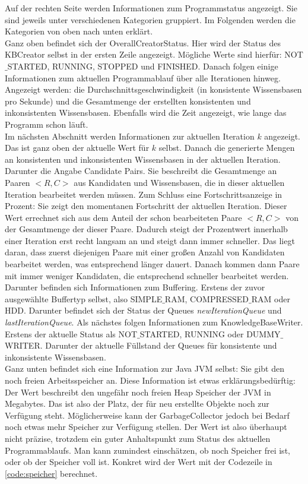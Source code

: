 \documentclass[12pt,a4paper]{article}
\begin{document}
Auf der rechten Seite werden Informationen zum Programmstatus angezeigt. Sie sind jeweils unter verschiedenen Kategorien gruppiert. Im Folgenden werden die Kategorien von oben nach unten erklärt. \\
Ganz oben befindet sich der OverallCreatorStatus. Hier wird der Status des KBCreator selbst in der ersten Zeile angezeigt. Mögliche Werte sind hierfür: NOT$\_$STARTED, RUNNING, STOPPED und FINISHED. Danach folgen einige Informationen zum aktuellen Programmablauf über alle Iterationen hinweg. Angezeigt werden: die Durchschnittsgeschwindigkeit (in konsistente Wissensbasen pro Sekunde) und die Gesamtmenge der erstellten konsistenten und inkonsistenten Wissensbasen. Ebenfalls wird die Zeit angezeigt, wie lange das Programm schon läuft. \\
Im nächsten Abschnitt werden Informationen zur aktuellen Iteration $k$ angezeigt. Das ist ganz oben der aktuelle Wert für $k$ selbst. Danach die generierte Mengen an konsistenten und inkonsistenten Wissensbasen in der aktuellen Iteration. Darunter die Angabe \glqq Candidate Pairs\grqq . Sie beschreibt die Gesamtmenge an Paaren $<R, C>$ aus Kandidaten und Wissensbasen, die in dieser aktuellen Iteration bearbeitet werden müssen. Zum Schluss eine Fortschrittsanzeige in Prozent: Sie zeigt den momentanen Fortschritt der aktuellen Iteration. Dieser Wert errechnet sich aus dem Anteil der schon bearbeiteten Paare $<R,C>$ von der Gesamtmenge der dieser Paare. Dadurch steigt der Prozentwert innerhalb einer Iteration erst recht langsam an und steigt dann immer schneller. Das liegt daran, dass zuerst diejenigen Paare mit einer großen Anzahl von Kandidaten bearbeitet werden, was entsprechend länger dauert. Danach kommen dann Paare mit immer weniger Kandidaten, die entsprechend schneller bearbeitet werden.\\
Darunter befinden sich Informationen zum Buffering. Erstens der zuvor ausgewählte Buffertyp selbst, also SIMPLE$\_$RAM, COMPRESSED$\_$RAM oder HDD. Darunter befindet sich der Status der Queues \textit{newIterationQueue} und \textit{lastIterationQueue}. Als nächstes folgen Informationen zum KnowledgeBaseWriter. Erstens der aktuelle Status als NOT$\_$STARTED, RUNNING oder DUMMY$\_$WRITER. Darunter der aktuelle Füllstand der Queues für konsistente und inkonsistente Wissensbasen. \\
Ganz unten befindet sich eine Information zur Java JVM selbst: Sie gibt den noch freien Arbeitsspeicher an. Diese Information ist etwas erklärungsbedürftig: Der Wert beschreibt den ungefähr noch freien Heap Speicher der JVM in Megabytes. Das ist also der Platz, der für neu erstellte Objekte noch zur Verfügung steht. Möglicherweise kann der GarbageCollector jedoch bei Bedarf noch etwas mehr Speicher zur Verfügung stellen. Der Wert ist also überhaupt nicht präzise, trotzdem ein guter Anhaltspunkt zum Status des aktuellen Programmablaufs. Man kann zumindest einschätzen, ob noch Speicher frei ist, oder ob der Speicher voll ist. Konkret wird der Wert mit der Codezeile in \autoref{code:speicher} berechnet.
\end{document}

